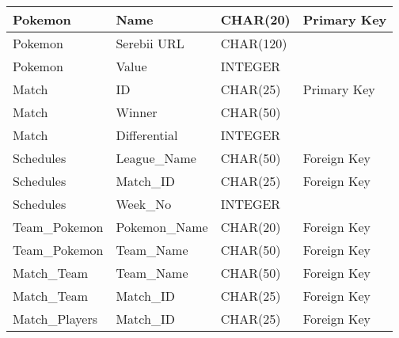 \documentclass{article}
\begin{document}
\begin{table}[H]
\begin{tabular}{|l|l|l|l|}
    {\color[HTML]{2E3436} Pokemon} & {\color[HTML]{2E3436} Name} & {\color[HTML]{2E3436} CHAR(20)} & {\color[HTML]{2E3436} Primary Key} \\ \hline
    {\color[HTML]{2E3436} Pokemon} & {\color[HTML]{2E3436} Serebii URL} & {\color[HTML]{2E3436} CHAR(120)} & {\color[HTML]{2E3436} } \\ \hline
    {\color[HTML]{2E3436} Pokemon} & {\color[HTML]{2E3436} Value} & {\color[HTML]{2E3436} INTEGER} & {\color[HTML]{2E3436} } \\ \hline
    {\color[HTML]{2E3436} Match} & {\color[HTML]{2E3436} ID} & {\color[HTML]{2E3436} CHAR(25)} & {\color[HTML]{2E3436} Primary Key} \\ \hline
    {\color[HTML]{2E3436} Match} & {\color[HTML]{2E3436} Winner} & {\color[HTML]{2E3436} CHAR(50)} & {\color[HTML]{2E3436} } \\ \hline
    {\color[HTML]{2E3436} Match} & {\color[HTML]{2E3436} Differential} & {\color[HTML]{2E3436} INTEGER} & {\color[HTML]{2E3436} } \\ \hline
    {\color[HTML]{2E3436} Schedules} & {\color[HTML]{2E3436} League\_Name} & {\color[HTML]{2E3436} CHAR(50)} & {\color[HTML]{2E3436} Foreign Key} \\ \hline
    {\color[HTML]{2E3436} Schedules} & {\color[HTML]{2E3436} Match\_ID} & {\color[HTML]{2E3436} CHAR(25)} & {\color[HTML]{2E3436} Foreign Key} \\ \hline
    {\color[HTML]{2E3436} Schedules} & {\color[HTML]{2E3436} Week\_No} & {\color[HTML]{2E3436} INTEGER} & {\color[HTML]{2E3436} } \\ \hline
    {\color[HTML]{2E3436} Team\_Pokemon} & {\color[HTML]{2E3436} Pokemon\_Name} & {\color[HTML]{2E3436} CHAR(20)} & {\color[HTML]{2E3436} Foreign Key} \\ \hline
    {\color[HTML]{2E3436} Team\_Pokemon} & {\color[HTML]{2E3436} Team\_Name} & {\color[HTML]{2E3436} CHAR(50)} & {\color[HTML]{2E3436} Foreign Key} \\ \hline
    {\color[HTML]{2E3436} Match\_Team} & {\color[HTML]{2E3436} Team\_Name} & {\color[HTML]{2E3436} CHAR(50)} & {\color[HTML]{2E3436} Foreign Key} \\ \hline
    {\color[HTML]{2E3436} Match\_Team} & {\color[HTML]{2E3436} Match\_ID} & {\color[HTML]{2E3436} CHAR(25)} & {\color[HTML]{2E3436} Foreign Key} \\ \hline
    {\color[HTML]{2E3436} Match\_Players} & {\color[HTML]{2E3436} Match\_ID} & {\color[HTML]{2E3436} CHAR(25)} & {\color[HTML]{2E3436} Foreign Key} \\ \hline

\end{tabular}
\end{table}
\end{document}
